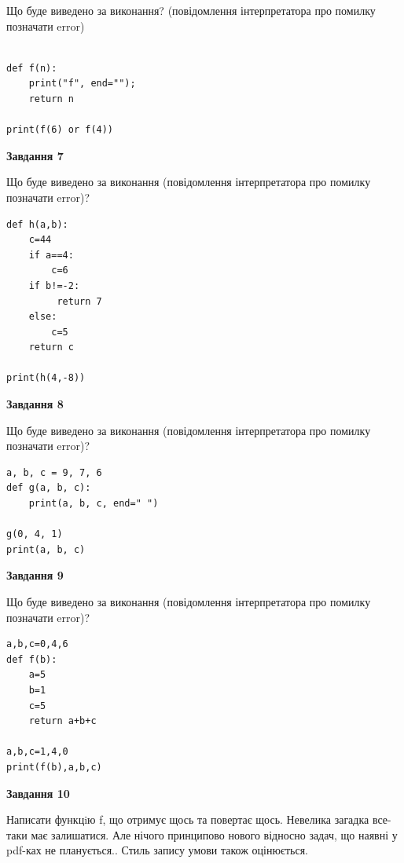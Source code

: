\documentclass[12pt, ukrainian]{article}
\begin{document}
{\begin {large}
Що буде виведено за виконання? (повідомлення інтерпретатора про помилку позначати error)\par
\begin{verbatim}

def f(n):
    print("f", end="");
    return n

print(f(6) or f(4))
\end{verbatim}

{\begin {center}\textbf{Завдання 7}\end {center}}

Що буде виведено за виконання (повідомлення інтерпретатора про помилку позначати error)?\par
\begin{verbatim}
def h(a,b):
    c=44
    if a==4:
        c=6
    if b!=-2:
         return 7
    else: 
        c=5
    return c

print(h(4,-8))
\end{verbatim}

{\begin {center}\textbf{Завдання 8}\end {center}}

Що буде виведено за виконання (повідомлення інтерпретатора про помилку позначати error)?\par
\begin{verbatim}
a, b, c = 9, 7, 6
def g(a, b, c):
    print(a, b, c, end=" ")

g(0, 4, 1)
print(a, b, c)
\end{verbatim}

{\begin {center}\textbf{Завдання 9}\end {center}}

Що буде виведено за виконання (повідомлення інтерпретатора про помилку позначати error)?\par
\begin{verbatim}
a,b,c=0,4,6
def f(b):
    a=5
    b=1
    c=5
    return a+b+c

a,b,c=1,4,0
print(f(b),a,b,c)
\end{verbatim}

{\begin {center}\textbf{Завдання 10}\end {center}}


Написати функцiю f, що отримує щось та повертає щось. Невелика загадка все-таки має залишатися. Але нічого принципово нового відносно задач, що наявні у pdf-ках не планується.. Стиль запису умови також оцінюється.\par
\end {large}}
\newpage
\end{document}
